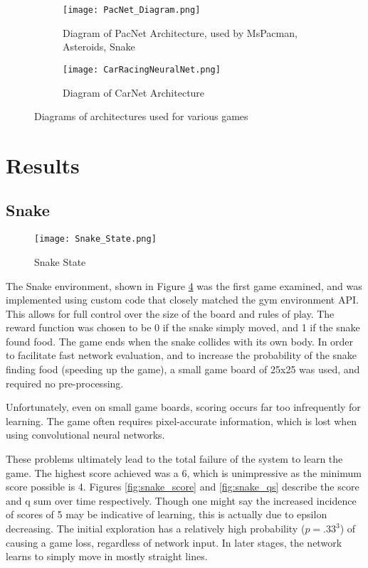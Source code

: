 \documentclass{article}
\begin{document}
\begin{figure}[h]
\centering
\begin{subfigure}{.6\textwidth}
  \centering
  \texttt{[image: PacNet\_Diagram.png]}
  \caption{\label{fig:pacnet_diagram}Diagram of PacNet Architecture, used by MsPacman, Asteroids, Snake}
\end{subfigure}%
\begin{subfigure}{.65\textwidth}
  \centering
  \texttt{[image: CarRacingNeuralNet.png]}
  \caption{\label{fig:carnet_diagram}Diagram of CarNet Architecture}
\end{subfigure}
\caption{Diagrams of architectures used for various games}
\end{figure}

\section{Results}

\subsection{Snake}

\begin{figure}[h]
  \centering
  \texttt{[image: Snake\_State.png]}
  \caption{\label{fig:snake_state}Snake State}
\end{figure}

The Snake environment, shown in Figure \ref{fig:snake_state} was the first game examined, and was implemented using custom code that closely matched the gym environment API. This allows for full control over the size of the board and rules of play. The reward function was chosen to be 0 if the snake simply moved, and 1 if the snake found food. The game ends when the snake collides with its own body. In order to facilitate fast network evaluation, and to increase the probability of the snake finding food (speeding up the game), a small game board of 25x25 was used, and required no pre-processing.

Unfortunately, even on small game boards, scoring occurs far too infrequently for learning. The game often requires pixel-accurate information, which is lost when using convolutional neural networks.

These problems ultimately lead to the total failure of the system to learn the game. The highest score achieved was a 6, which is unimpressive as the minimum score possible is 4. Figures \ref{fig:snake_score} and \ref{fig:snake_qs} describe the score and q sum over time respectively. Though one might say the increased incidence of scores of 5 may be indicative of learning, this is actually due to epsilon decreasing. The initial exploration has a relatively high probability ($p=.33^3$) of causing a game loss, regardless of network input. In later stages, the network learns to simply move in mostly straight lines.
\end{document}
